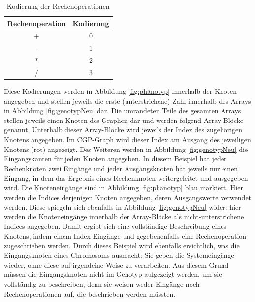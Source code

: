 \begin{table}[H]
    \centering
    \begin{tabular}{c | c}
       \textbf{Rechenoperation} & \textbf{Kodierung} \\ \hline
        + & 0 \\ \hline
        - & 1 \\ \hline
        * & 2 \\ \hline
        / & 3
    \end{tabular}
    \caption{Kodierung der Rechenoperationen}
    \label{table:kodierung}
\end{table}

Diese Kodierungen werden in Abbildung \ref{fig:phänotyp} innerhalb der Knoten angegeben und stellen jeweils die erste (unterstrichene) Zahl innerhalb des Arrays in Abbildung \ref{fig:genotypNeu} dar.
Die umrandeten Teile des gesamten Arrays stellen jeweils einen Knoten des Graphen dar und werden folgend Array-Blöcke genannt.
Unterhalb dieser Array-Blöcke wird jeweils der Index des zugehörigen Knotens angegeben.
Im CGP-Graph wird dieser Index am Ausgang des jeweiligen Knotens (rot) angezeigt.\newline
Des Weiteren werden in Abbildung \ref{fig:genotypNeu} die Eingangskanten für jeden Knoten angegeben. 
In diesem Beispiel hat jeder Rechenknoten zwei Eingänge und jeder Ausgangsknoten hat jeweils nur einen Eingang, in dem das Ergebnis eines Rechenknoten weitergeleitet und ausgegeben wird.
Die Knoteneingänge sind in Abbildung \ref{fig:phänotyp} blau markiert.
Hier werden die Indices derjenigen Knoten angegeben, deren Ausgangswerte verwendet werden.
Diese spiegeln sich ebenfalls in Abbildung \ref{fig:genotypNeu} wider: hier werden die Knoteneingänge innerhalb der Array-Blöcke als nicht-unterstrichene Indices angegeben.
Damit ergibt sich eine vollständige Beschreibung eines Knotens, indem einem Index Eingänge und gegebenenfalls eine Rechenoperation zugeschrieben werden.\newline
Durch dieses Beispiel wird ebenfalls ersichtlich, was die Eingangsknoten eines Chromosoms ausmacht:
Sie geben die Systemeingänge wieder, ohne diese auf irgendeine Weise zu verarbeiten.
Aus diesem Grund müssen die Eingangsknoten nicht im Genotyp aufgezeigt werden, um sie vollständig zu beschreiben, denn sie weisen weder Eingänge noch Rechenoperationen auf, die beschrieben werden müssten.


